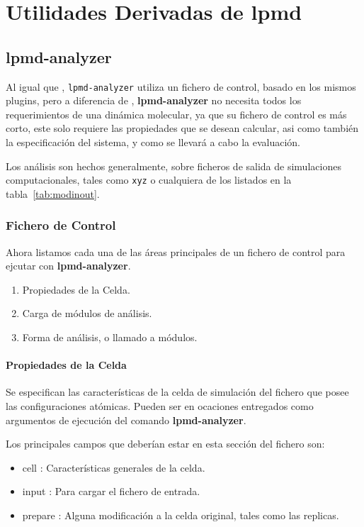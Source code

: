 \chapter{Utilidades Derivadas de lpmd}
\label{chap:utilidades}
\section{lpmd-analyzer}

Al igual que \lpmd, \verb|lpmd-analyzer| utiliza un fichero de control, basado en los mismos plugins, pero a diferencia de \lpmd, \textbf{lpmd-analyzer} no necesita todos los requerimientos de una din\'amica molecular, ya que su fichero de control es m\'as corto, este solo requiere las propiedades que se desean calcular, asi como tambi\'en la especificaci\'on del sistema, y como se llevar\'a a cabo la evaluaci\'on.

Los an\'alisis son hechos generalmente, sobre ficheros de salida de simulaciones computacionales, tales como \verb|xyz| o cualquiera de los listados en la tabla~\ref{tab:modinout}.

\subsection{Fichero de Control}
Ahora listamos cada una de las \'areas principales de un fichero de control para ejcutar con \textbf{lpmd-analyzer}.

\begin{enumerate}
 \item Propiedades de la Celda.
 \item Carga de m\'odulos de an\'alisis.
 \item Forma de an\'alisis, o llamado a m\'odulos.
\end{enumerate}

\subsubsection{Propiedades de la Celda}
Se especifican las caracter\'isticas de la celda de simulaci\'on del fichero que posee las configuraciones at\'omicas. Pueden ser en ocaciones entregados como argumentos de ejecuci\'on del comando \textbf{lpmd-analyzer}.

Los principales campos que deber\'ian estar en esta secci\'on del fichero son:
\begin{itemize}
 \item cell : Caracter\'isticas generales de la celda.
 \item input : Para cargar el fichero de entrada.
 \item prepare : Alguna modificaci\'on a la celda original, tales como las replicas.
\end{itemize}
